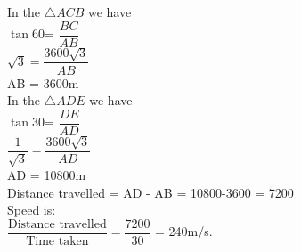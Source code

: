 \documentclass[journal,12pt,twocolumn]{IEEEtran}
\renewcommand\thesection{\arabic{section}}
\begin{document}
\begin{enumerate}[label=\thesection.\arabic*.,ref=\thesection.\theenumi]
In the $\triangle ACB$ we have\\

$ \tan 60$\textdegree = $\dfrac{BC}{AB}$ \\  

$\sqrt{3} = \dfrac{3600\sqrt{3}}{AB}$ \\

AB = 3600m \\

In the $\triangle ADE$ we have\\

$ \tan 30$\textdegree = $\dfrac{DE}{AD}$ \\  

$\dfrac{1}{\sqrt{3}} = \dfrac{3600\sqrt{3}}{AD}$ \\

AD = 10800m \\
Distance travelled = AD - AB = 10800-3600 = 7200 \\
Speed is: \\

$\dfrac{\text{Distance travelled}}{\text{Time taken}} = \dfrac{7200}{30}$ = 240m/s. \\




\end{enumerate}
\end{document}
